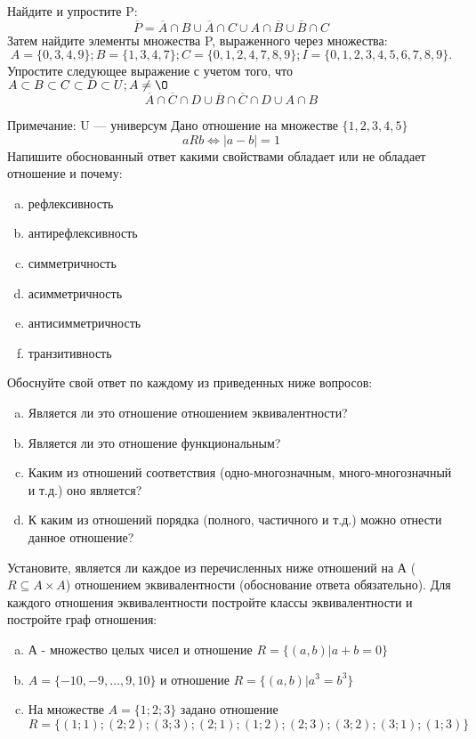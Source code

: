 \documentclass[10pt]{exam}
\begin{document}
\begin{questions}
\question
Найдите и упростите P:
\begin{equation*}
\overline{P} = \overline{A} \cap B \cup \overline{A} \cap C \cup A \cap \overline{B} \cup \overline{B} \cap C
\end{equation*}
Затем найдите элементы множества P, выраженного через множества:
\begin{equation*}
A = \{0, 3, 4, 9\}; 
B = \{1, 3, 4, 7\};
C = \{0, 1, 2, 4, 7, 8, 9\};
I = \{0, 1, 2, 3, 4, 5, 6, 7, 8, 9\}.
\end{equation*}\question
Упростите следующее выражение с учетом того, что $A\subset B \subset C \subset D \subset U; A \neq \O$
\begin{equation*}
\overline{A} \cap \overline{C} \cap D \cup \overline{B} \cap \overline{C} \cap D \cup A \cap B
\end{equation*}

Примечание: U — универсум\question
Дано отношение на множестве $\{1, 2, 3, 4, 5\}$ 
\begin{equation*}
aRb \iff |a-b| = 1
\end{equation*}
Напишите обоснованный ответ какими свойствами обладает или не обладает отношение и почему:   
\begin{enumerate} [a)]\setcounter{enumi}{0}
\item рефлексивность
\item антирефлексивность
\item симметричность
\item асимметричность
\item антисимметричность
\item транзитивность
\end{enumerate}

Обоснуйте свой ответ по каждому из приведенных ниже вопросов:
\begin{enumerate} [a)]\setcounter{enumi}{0}
    \item Является ли это отношение отношением эквивалентности?
    \item Является ли это отношение функциональным?
    \item Каким из отношений соответствия (одно-многозначным, много-многозначный и т.д.) оно является?
    \item К каким из отношений порядка (полного, частичного и т.д.) можно отнести данное отношение?
\end{enumerate}

\question
Установите, является ли каждое из перечисленных ниже отношений на А ($R \subseteq A \times A$) отношением эквивалентности (обоснование ответа обязательно). Для каждого отношения эквивалентности 
постройте классы эквивалентности и постройте граф отношения:
\begin{enumerate}[a)]\setcounter{enumi}{0}
\item А - множество целых чисел и отношение $R = \{(a,b)|a + b = 0\}$
\item $A = \{-10, -9, …, 9, 10\}$ и отношение $R = \{(a,b)|a^{3} = b^{3}\}$
\item На множестве $A = \{1; 2; 3\}$ задано отношение $R = \{(1; 1); (2; 2); (3; 3); (2; 1); (1; 2); (2; 3); (3; 2); (3; 1); (1; 3)\}$


\end{enumerate}
\end{questions}
\end{document}
